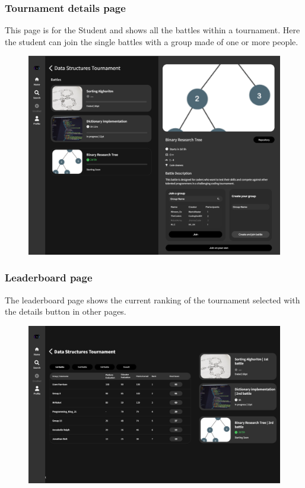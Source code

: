 \documentclass[12pt, a4paper]{report}
\begin{document}
        \subsubsection{Tournament details page} 
        This page is for the Student and shows all the battles within a tournament. 
        Here the student can join the single battles with a group made of one or more people. 
        \begin{figure}[H]
            \centering
            \includegraphics[width=0.8\linewidth]{images/tournament_details.png}
        \end{figure}

        \subsubsection{Leaderboard page} 
        The leaderboard page shows the current ranking of the tournament selected with the details button in other pages. 
        \begin{figure}[H]
            \centering
            \includegraphics[width=0.8\linewidth]{images/leaderboard.png}
        \end{figure}
\end{document}

